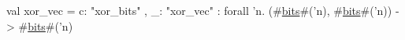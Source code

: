 val xor_vec = {c: "xor_bits" , _: "xor_vec"} : forall 'n. (#\hyperref[zbits]{bits}#('n), #\hyperref[zbits]{bits}#('n)) -> #\hyperref[zbits]{bits}#('n)
